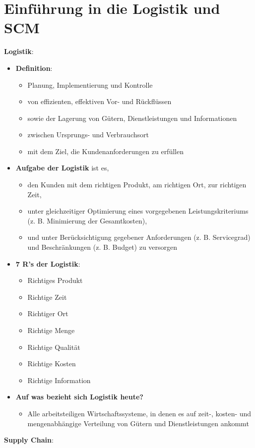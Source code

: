 \section{Einführung in die Logistik und SCM}

\textbf{Logistik}:
\begin{itemize}
	\item \textbf{Definition}: 
	\begin{itemize}
		\item Planung, Implementierung und Kontrolle 
		\item von effizienten, effektiven Vor- und Rückflüssen 
		\item sowie der Lagerung von Gütern, Dienstleistungen und Informationen 
		\item zwischen Ursprungs- und Verbrauchsort 
		\item mit dem Ziel, die Kundenanforderungen zu erfüllen
	\end{itemize}
	\item \textbf{Aufgabe der Logistik} ist es,
	\begin{itemize}
		\item den Kunden mit dem richtigen Produkt, am richtigen Ort, zur richtigen Zeit,
		\item unter gleichzeitiger Optimierung eines vorgegebenen Leistungskriteriums (z. B.
		Minimierung der Gesamtkosten),
		\item und unter Berücksichtigung gegebener Anforderungen (z. B. Servicegrad) und
		Beschränkungen (z. B. Budget) zu versorgen
	\end{itemize}
	\item \textbf{7 R's der Logistik}:
	\begin{itemize}
		\item Richtiges Produkt
		\item Richtige Zeit
		\item Richtiger Ort
		\item Richtige Menge
		\item Richtige Qualität
		\item Richtige Kosten
		\item Richtige Information
	\end{itemize}
	\item \textbf{Auf was bezieht sich Logistik heute?}
	\begin{itemize}
		\item Alle arbeitsteiligen Wirtschaftssysteme, in denen es auf zeit-, kosten- und
		mengenabhängige Verteilung von Gütern und Dienstleistungen ankommt
	\end{itemize}
\end{itemize}
\bigskip
\textbf{Supply Chain}: 

